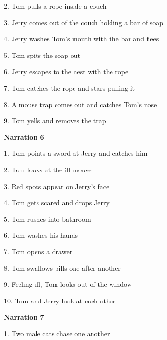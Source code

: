 \begin{appendix}
2. Tom pulls a rope inside a couch \vspace{-0.3cm}

3. Jerry comes out of the couch holding a bar of soap \vspace{-0.3cm}

4. Jerry washes Tom's mouth with the bar and flees \vspace{-0.3cm}

5. Tom spits the soap out \vspace{-0.3cm}

6. Jerry escapes to the nest with the rope \vspace{-0.3cm}

7. Tom catches the rope and stars pulling it \vspace{-0.3cm}

8. A mouse trap comes out and catches Tom's nose \vspace{-0.3cm}

9. Tom yells and removes the trap

\textbf{Narration 6} \vspace{-0.3cm}

1. Tom points a sword at Jerry and catches him \vspace{-0.3cm}

2. Tom looks at the ill mouse \vspace{-0.3cm}

3. Red spots appear on Jerry's face \vspace{-0.3cm}

4. Tom gets scared and drops Jerry \vspace{-0.3cm}

5. Tom rushes into bathroom \vspace{-0.3cm}

6. Tom washes his hands \vspace{-0.3cm}

7. Tom opens a drawer \vspace{-0.3cm}

8. Tom swallows pills one after another \vspace{-0.3cm}

9. Feeling ill, Tom looks out of the window \vspace{-0.3cm}

10. Tom and Jerry look at each other

\textbf{Narration 7} \vspace{-0.3cm}

1. Two male cats chase one another \vspace{-0.3cm}


\end{appendix}

